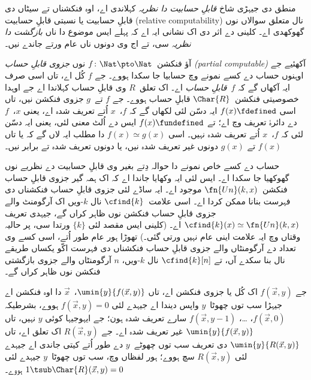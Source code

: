\documentclass[../../../include/open-logic-section]{subfiles}
\begin{document}

منطق دی جیہڑی شاخ \emph{قابلِ حسابیت دا نظریہ} کہلاندی اے،
اوہ فنکشناں تے سیٹاں دی قابلِ حسابیت یا نسبتی قابلِ حسابیت
(relative computability) نال متعلق سوالاں نوں گھوکھدی اے۔
کلینی دے اثر دی اک نشانی ایہ اے کہ پہلے ایس موضوع دا ناں
\emph{بازگشت دا نظریہ} سی، تے اج وی دونوں ناں عام ورتے جاندے نیں۔

آؤ فنکشن~$f\colon \Nat \pto \Nat$ نوں \emph{جزوی قابلِ حساب
  (partial computable)} آکھئیے جے اوہنوں حساب دے کسے نمونے وچ
حسابیا جا سکدا ہووے۔ جے $f$ کُل اے، تاں اسی صرف ایہ آکھاں گے
کہ $f$~\emph{قابلِ حساب} اے۔ اک تعلق~$R$ وی قابلِ حساب کہلاندا اے
جے اوہدا خصوصیتی فنکشن~$\Char{R}$ قابلِ حساب ہووے۔ جے $f$
تے~$g$ جزوی فنکشن نیں، تاں اسی $f(x) \fdefined$ ایہ دسّن لئی
لکھاں گے کہ $f$،~$x$ اُتے تعریف شدہ اے، یعنی $x$،~$f$ دے
دائرۂ تعریف وچ اے؛ تے $f(x) \fundefined$ ایس دے اُلٹ معنی لئی،
یعنی ایہ دسّن لئی کہ $f$،~$x$ اُتے تعریف شدہ نہیں۔ اسی
$f(x) \simeq g(x)$ دا مطلب ایہ لاں گے کہ یا تاں $f(x)$ تے
$g(x)$ دونوں غیر تعریف شدہ نیں، یا دونوں تعریف شدہ تے برابر نیں۔

حساب دے کسے خاص نمونے دا حوالہ دِتے بغیر وی قابلِ حسابیت دے
نظریے نوں گھوکھیا جا سکدا اے۔ ایس لئی ایہ وکھایا جاندا اے کہ
اک ہمہ گیر جزوی قابلِ حساب فنکشن~$\fn{Un}(k, x)$ موجود اے۔
ایہ ساڈے لئی جزوی قابلِ حساب فنکشناں دی فہرست بنانا ممکن کردا
اے۔ اسی علامت~$\cfind{k}$ نال $k$-ویں اک آرگومنٹ والے جزوی
قابلِ حساب فنکشن نوں ظاہر کراں گے، جیہدی تعریف
$\cfind{k}(x) \simeq \fn{Un}(k, x)$ اے۔ (کلینی ایس مقصد لئی
$\{ k \}$ ورتدا سی، پر حالیہ وقتاں وچ ایہ علامت اینی عام نہیں
ورتی گئی۔) تھوڑا ہور عام طور اُتے، اسی کسے وی تعداد دے
آرگومنٹاں والے جزوی قابلِ حساب فنکشناں دی فہرست اکّو یکساں
طریقے نال بنا سکدے آں، تے $\cfind{k}[n]$ نال $k$-ویں،
$n$ آرگومنٹاں والے جزوی بازگشتی فنکشن نوں ظاہر کراں گے۔

جے $f(\vec x, y)$ اک کُل یا جزوی فنکشن اے، تاں $\umin{y}{f
(\vec x, y)}$،~$\vec x$ دا اوہ فنکشن اے جیہڑا سب توں
چھوٹا~$y$ واپس دیندا اے جیہدے لئی $f(\vec x, y) = 0$
ہووے، بشرطیکہ $f(\vec x, 0)$، \dots، $f(\vec x, y-1)$
سارے تعریف شدہ ہون؛ جے ایہوجیہا کوئی $y$ نہیں، تاں
$\umin{y}{f (\vec x, y)}$ غیر تعریف شدہ اے۔ جے $R(\vec x, y)$
اک تعلق اے، تاں $\umin{y}{R(\vec x, y)}$ دی تعریف سب توں
چھوٹے~$y$ دے طور اُتے کیتی جاندی اے جیہدے لئی $R(\vec x, y)$
سچ ہووے؛ ہور لفظاں وچ، سب توں چھوٹا~$y$ جیہدے لئی
$1 \tsub \Char{R}(\vec x, y) = 0$ ہووے۔
\end{document}
